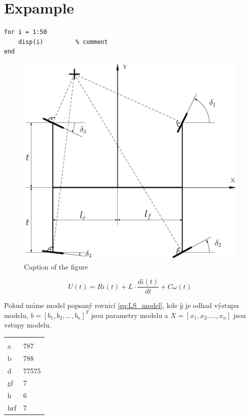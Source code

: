 \chapter{Expample}
\label{chap:Expample}

\lipsum[1]

\begin{lstlisting}
for i = 1:50
	disp(i)			% comment         
end
\end{lstlisting}

\begin{figure}[!h] 
	\begin{center}
		\includegraphics[scale=0.4]{images/example_fig.pdf}
	\end{center}
	\caption[Caption in list of figures]{Caption of the figure}
	\label{fig:figurelabel}
\end{figure}	

\lipsum[2]

\begin{equation}\label{eq:DCmot}
U(t) = Ri(t) + L\cdot\frac{di(t)}{dt} + C\omega(t)
\end{equation}

Pokud máme model popsaný rovnicí \ref{eq:LS_model}, kde \boldmath $\hat{y}$ je odhad výstupu modelu, $b = \left[b_1,b_2,...,b_n\right]^T$ jsou parametry modelu a $X = \left[x_1,x_2,...,x_n\right]$ jsou vstupy modelu, \unboldmath

\begin{center}
	\begin{tabular}{ll}
		&  \\ 
		a & 787 \\ 
		b & 788 \\ 
		d & 77575 \\ 
		gf & 7 \\ 
		h & 6 \\ 
		hrf & 7 \\ 
	\end{tabular} 
\end{center}


